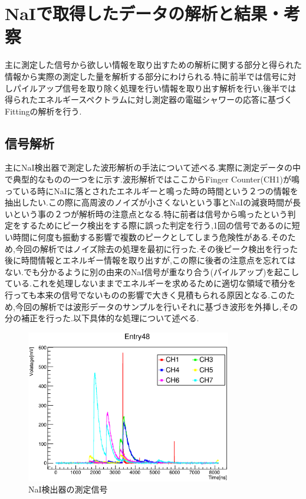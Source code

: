 
%
\section{NaIで取得したデータの解析と結果・考察}
主に測定した信号から欲しい情報を取り出すための解析に関する部分と得られた情報から実際の測定した量を解析する部分にわけられる.特に前半では信号に対しパイルアップ信号を取り除く処理を行い情報を取り出す解析を行い,後半では得られたエネルギースペクトラムに対し測定器の電磁シャワーの応答に基づくFittingの解析を行う.



\subsection{信号解析}
主にNaI検出器で測定した波形解析の手法について述べる.実際に測定データの中で典型的なものの一つをに示す.波形解析ではここからFinger Counter(CH1)が鳴っている時にNaIに落とされたエネルギーと鳴った時の時間という２つの情報を抽出したい.この際に高周波のノイズが小さくないという事とNaIの減衰時間が長いという事の２つが解析時の注意点となる.特に前者は信号から鳴ったという判定をするためにピーク検出をする際に誤った判定を行う,1回の信号であるのに短い時間に何度も振動する影響で複数のピークとしてしまう危険性がある.そのため,今回の解析ではノイズ除去の処理を最初に行った.その後ピーク検出を行った後に時間情報とエネルギー情報を取り出すが,この際に後者の注意点を忘れてはない.でも分かるように別の由来のNaI信号が重なり合う(パイルアップ)を起こしている.これを処理しないままでエネルギーを求めるために適切な領域で積分を行っても本来の信号でないものの影響で大きく見積もられる原因となる.このため,今回の解析では波形データのサンプルを行いそれに基づき波形を外挿し,その分の補正を行った.以下具体的な処理について述べる.
\begin{figure}[bht]
  \centering
  \includegraphics[width=0.8\textwidth]{figure/hatano/rawdata.eps}
  \caption{NaI検出器の測定信号}
  \label{hatano_fig:rawdata}
\end{figure}

